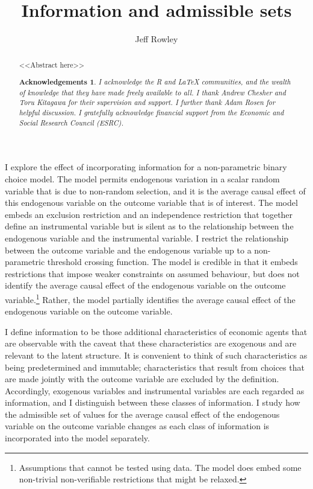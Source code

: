 \documentclass[12pt,a4paper,twoside]{article}
\title{Information and admissible sets}
\author{Jeff Rowley}
\newtheorem*{Acknowledgements}{Acknowledgements}
\numberwithin{equation}{section}
\newcommand{\ESRC}{I gratefully acknowledge financial support from the Economic and Social Research Council (ESRC).}
\newcommand{\RLaTeX}{I acknowledge the \emph{R} and \emph{\LaTeX} communities, and the wealth of knowledge that they have made freely available to all.}
\begin{document}
\maketitle
\vspace{10mm}
\begin{abstract}
\noindent <<Abstract here>>
\begin{Acknowledgements}
{\RLaTeX} I thank Andrew Chesher and Toru Kitagawa for their supervision and support. I further thank Adam Rosen for helpful discussion. {\ESRC}
\end{Acknowledgements}
\end{abstract}
\vspace{5mm}
I explore the effect of incorporating information for a non-parametric binary choice model. The model permits endogenous variation in a scalar random variable that is due to non-random selection, and it is the average causal effect of this endogenous variable on the outcome variable that is of interest. The model embeds an exclusion restriction and an independence restriction that together define an instrumental variable but is silent as to the relationship between the endogenous variable and the instrumental variable. I restrict the relationship between the outcome variable and the endogenous variable up to a non-parametric threshold crossing function. The model is credible \citep{book.manski} in that it embeds restrictions that impose weaker constraints on assumed behaviour, but does not identify the average causal effect of the endogenous variable on the outcome variable.\footnote{Assumptions that cannot be tested using data. The model does embed some non-trivial non-verifiable restrictions that might be relaxed.} Rather, the model partially identifies the average causal effect of the endogenous variable on the outcome variable. 

I define information to be those additional characteristics of economic agents that are observable with the caveat that these characteristics are exogenous and are relevant to the latent structure. It is convenient to think of such characteristics as being predetermined and immutable; characteristics that result from choices that are made jointly with the outcome variable are excluded by the definition. Accordingly, exogenous variables and instrumental variables are each regarded as information, and I distinguish between these classes of information. I study how the admissible set of values for the average causal effect of the endogenous variable on the outcome variable changes as each class of information is incorporated into the model separately. 
\end{document}
